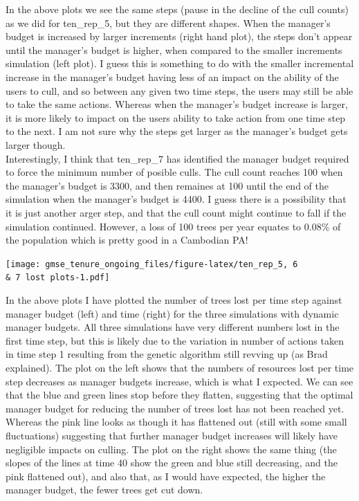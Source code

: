 \documentclass[
]{article}
\begin{document}
In the above plots we see the same steps (pause in the decline of the
cull counts) as we did for ten\_rep\_5, but they are different shapes.
When the manager's budget is increased by larger increments (right hand
plot), the steps don't appear until the manager's budget is higher, when
compared to the smaller increments simulation (left plot). I guess this
is something to do with the smaller incremental increase in the
manager's budget having less of an impact on the ability of the users to
cull, and so between any given two time steps, the users may still be
able to take the same actions. Whereas when the manager's budget
increase is larger, it is more likely to impact on the users ability to
take action from one time step to the next. I am not sure why the steps
get larger as the manager's budget gets larger though.\\
Interestingly, I think that ten\_rep\_7 has identified the manager
budget required to force the minimum number of posible culls. The cull
count reaches 100 when the manager's budget is 3300, and then remaines
at 100 until the end of the simulation when the manager's budget is
4400. I guess there is a possibility that it is just another arger step,
and that the cull count might continue to fall if the simulation
continued. However, a loss of 100 trees per year equates to 0.08\% of
the population which is pretty good in a Cambodian PA!

\texttt{[image: gmse\_tenure\_ongoing\_files/figure-latex/ten\_rep\_5, 6 \\\& 7 lost plots-1.pdf]}

In the above plots I have plotted the number of trees lost per time step
against manager budget (left) and time (right) for the three simulations
with dynamic manager budgets. All three simulations have very different
numbers lost in the first time step, but this is likely due to the
variation in number of actions taken in time step 1 resulting from the
genetic algorithm still revving up (as Brad explained). The plot on the
left shows that the numbers of resources lost per time step decreases as
manager budgets increase, which is what I expected. We can see that the
blue and green lines stop before they flatten, suggesting that the
optimal manager budget for reducing the number of trees lost has not
been reached yet. Whereas the pink line looks as though it has flattened
out (still with some small fluctuations) suggesting that further manager
budget increases will likely have negligible impacts on culling. The
plot on the right shows the same thing (the slopes of the lines at time
40 show the green and blue still decreasing, and the pink flattened
out), and also that, as I would have expected, the higher the manager
budget, the fewer trees get cut down.
\end{document}
